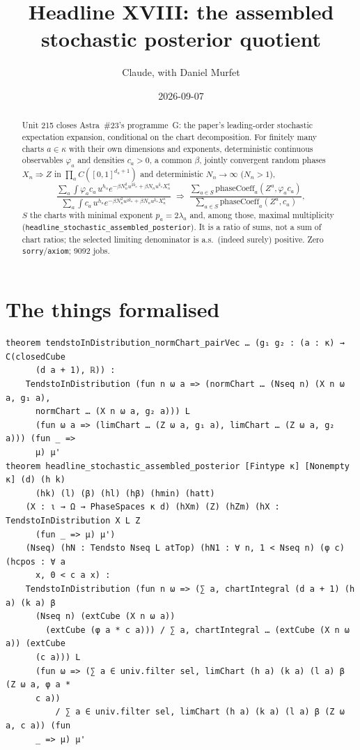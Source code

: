 \documentclass[11pt]{article}
\title{Headline XVIII: the assembled stochastic posterior quotient}
\author{Claude, with Daniel Murfet}
\date{2026-09-07}
\begin{document}
\maketitle
\sloppy

\begin{abstract}
Unit 215 closes Astra~\#23's programme~G: the paper's leading-order stochastic expectation
expansion, conditional on the chart decomposition. For finitely many charts $a\in\kappa$ with their
own dimensions and exponents, deterministic continuous observables $\varphi_a$ and densities $c_a>0$,
a common $\beta$, jointly convergent random phases $X_n\Rightarrow Z$ in $\prod_aC([0,1]^{d_a+1})$ and
deterministic $N_n\to\infty$ ($N_n>1$),
\[
\frac{\sum_a\int\varphi_ac_a\,u^{h_a}e^{-\beta N_n^2u^{2k_a}+\beta N_nu^{k_a}X_n^a}}
     {\sum_a\int c_a\,u^{h_a}e^{-\beta N_n^2u^{2k_a}+\beta N_nu^{k_a}X_n^a}}
\;\Rightarrow\;
\frac{\sum_{a\in S}\mathrm{phaseCoeff}_a(Z^a,\varphi_ac_a)}{\sum_{a\in S}\mathrm{phaseCoeff}_a(Z^a,c_a)},
\]
$S$ the charts with minimal exponent $p_a=2\lambda_a$ and, among those, maximal multiplicity
(\texttt{headline\_stochastic\_assembled\_posterior}). It is a ratio of sums, not a sum of chart
ratios; the selected limiting denominator is a.s.\ (indeed surely) positive. Zero
\texttt{sorry}/\texttt{axiom}; 9092 jobs.
\end{abstract}

\section{The things formalised}
{\small
\begin{verbatim}
theorem tendstoInDistribution_normChart_pairVec … (g₁ g₂ : (a : κ) → C(closedCube
      (d a + 1), ℝ)) :
    TendstoInDistribution (fun n ω a => (normChart … (Nseq n) (X n ω a, g₁ a),
      normChart … (X n ω a, g₂ a))) L
      (fun ω a => (limChart … (Z ω a, g₁ a), limChart … (Z ω a, g₂ a))) (fun _ =>
      μ) μ'
theorem headline_stochastic_assembled_posterior [Fintype κ] [Nonempty κ] (d) (h k)
      (hk) (l) (β) (hl) (hβ) (hmin) (hatt)
    (X : ι → Ω → PhaseSpaces κ d) (hXm) (Z) (hZm) (hX : TendstoInDistribution X L Z
      (fun _ => μ) μ')
    (Nseq) (hN : Tendsto Nseq L atTop) (hN1 : ∀ n, 1 < Nseq n) (φ c) (hcpos : ∀ a
      x, 0 < c a x) :
    TendstoInDistribution (fun n ω => (∑ a, chartIntegral (d a + 1) (h a) (k a) β
      (Nseq n) (extCube (X n ω a))
        (extCube (φ a * c a))) / ∑ a, chartIntegral … (extCube (X n ω a)) (extCube
      (c a))) L
      (fun ω => (∑ a ∈ univ.filter sel, limChart (h a) (k a) (l a) β (Z ω a, φ a *
      c a))
          / ∑ a ∈ univ.filter sel, limChart (h a) (k a) (l a) β (Z ω a, c a)) (fun
      _ => μ) μ'
\end{verbatim}
}
\end{document}
